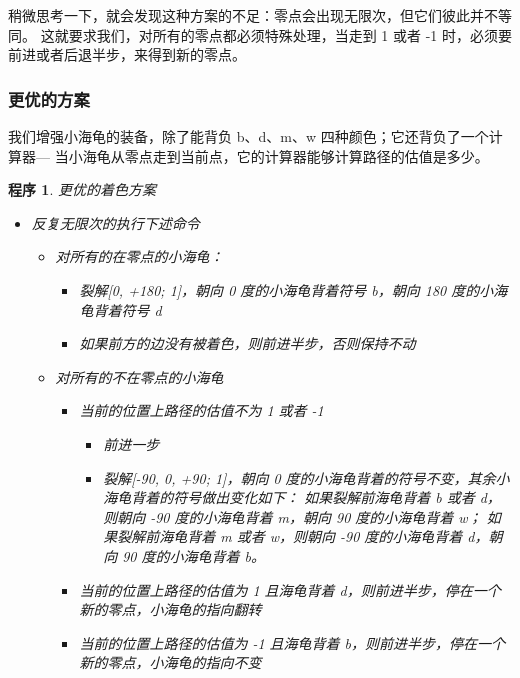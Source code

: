 \documentclass[a4paper,12pt]{article}
\newtheorem{program}{程序}
\begin{document}
稍微思考一下，就会发现这种方案的不足：零点会出现无限次，但它们彼此并不等同。
这就要求我们，对所有的零点都必须特殊处理，当走到 1 或者 -1 时，必须要前进或者后退半步，来得到新的零点。

\subsubsection{更优的方案}

我们增强小海龟的装备，除了能背负 b、d、m、w 四种颜色；它还背负了一个计算器—
当小海龟从零点走到当前点，它的计算器能够计算路径的估值是多少。

\begin{program}
更优的着色方案
\begin{itemize}
    \item 反复无限次的执行下述命令
    \begin{itemize}
        \item 对所有的在零点的小海龟：
        \begin{itemize}
            \item 裂解[0, +180; 1]，朝向 0 度的小海龟背着符号 b，朝向 180 度的小海龟背着符号 d
            \item 如果前方的边没有被着色，则前进半步，否则保持不动
        \end{itemize}
        \item 对所有的不在零点的小海龟
        \begin{itemize}
            \item 当前的位置上路径的估值不为 1 或者 -1
            \begin{itemize}
                \item 前进一步
                \item 裂解[-90, 0, +90; 1]，朝向 0 度的小海龟背着的符号不变，其余小海龟背着的符号做出变化如下：
                    如果裂解前海龟背着 b 或者 d，则朝向 -90 度的小海龟背着 m，朝向 90 度的小海龟背着 w；
                    如果裂解前海龟背着 m 或者 w，则朝向 -90 度的小海龟背着 d，朝向 90 度的小海龟背着 b。
            \end{itemize}
            \item 当前的位置上路径的估值为 1 且海龟背着 d，则前进半步，停在一个新的零点，小海龟的指向翻转
            \item 当前的位置上路径的估值为 -1 且海龟背着 b，则前进半步，停在一个新的零点，小海龟的指向不变
        \end{itemize}
    \end{itemize}
\end{itemize}
\end{program}
\end{document}
